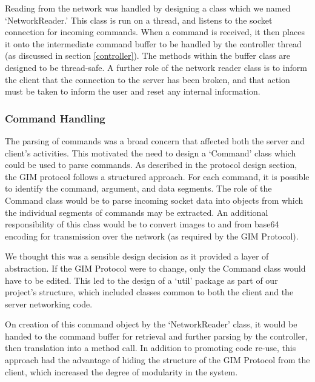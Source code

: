 Reading from the network was handled by designing a class which we named `NetworkReader.' This class is run on a thread, and listens to the socket connection for incoming commands. When a command is received, it then places it onto the intermediate command buffer to be handled by the controller thread (as discussed in section \ref{controller}). The methods within the buffer class are designed to be thread-safe. A further role of the network reader class is to inform the client that the connection to the server has been broken, and that action must be taken to inform the user and reset any internal information.

\subsubsection {Command Handling}

The parsing of commands was a broad concern that affected both the server and client's activities. This motivated the need to design a `Command' class which could be used to parse commands. As described in the protocol design section, the GIM protocol follows a structured approach. For each command, it is possible to identify the command, argument, and data segments. The role of the Command class would be to parse incoming socket data into objects from which the individual segments of commands may be extracted. An additional responsibility of this class would be to convert images to and from base64 encoding for transmission over the network (as required by the GIM Protocol).

We thought this was a sensible design decision as it provided a layer of abstraction. If the GIM Protocol were to change, only the Command class would have to be edited. This led to the design of a `util' package as part of our project's structure, which included classes common to both the client and the server networking code. 

On creation of this command object by the `NetworkReader' class, it would be handed to the command buffer for retrieval and further parsing by the controller, then translation into a method call. In addition to promoting code re-use, this approach had the advantage of hiding the structure of the GIM Protocol from the client, which increased the degree of modularity in the system.   

















